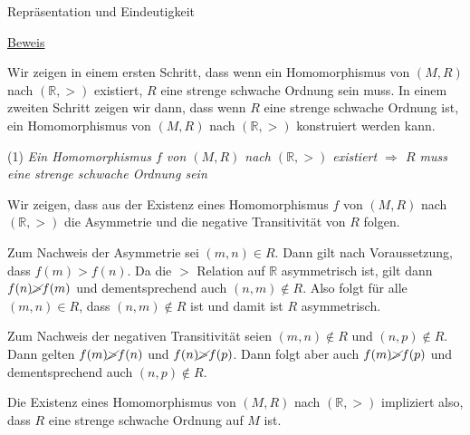 \documentclass[
  8pt,
  ignorenonframetext,
]{beamer}
\begin{document}
\begin{frame}{Repräsentation und Eindeutigkeit}
\protect\hypertarget{repruxe4sentation-und-eindeutigkeit-1}{}
\footnotesize

\underline{Beweis}

Wir zeigen in einem ersten Schritt, dass wenn ein Homomorphismus von
\((M,R)\) nach \((\mathbb{R},>)\) existiert, \(R\) eine strenge schwache
Ordnung sein muss. In einem zweiten Schritt zeigen wir dann, dass wenn
\(R\) eine strenge schwache Ordnung ist, ein Homomorphismus von
\((M,R)\) nach \((\mathbb{R}, >)\) konstruiert werden kann.

\noindent (1) \emph{Ein Homomorphismus \(f\) von \((M,R)\) nach
\((\mathbb{R},>)\) existiert \(\Rightarrow\) \(R\) muss eine strenge
schwache Ordnung sein}

Wir zeigen, dass aus der Existenz eines Homomorphismus \(f\) von
\((M,R)\) nach \((\mathbb{R},>)\) die Asymmetrie und die negative
Transitivität von \(R\) folgen.

Zum Nachweis der Asymmetrie sei \((m,n) \in R\). Dann gilt nach
Voraussetzung, dass \(f(m) > f(n)\). Da die \(>\) Relation auf
\(\mathbb{R}\) asymmetrisch ist, gilt dann \(f(n) \cancel{>} f(m)\) und
dementsprechend auch \((n,m) \notin R\). Also folgt für alle
\((m,n) \in R\), dass \((n,m) \notin R\) ist und damit ist \(R\)
asymmetrisch.

Zum Nachweis der negativen Transitivität seien \((m,n)\notin R\) und
\((n,p)\notin R\). Dann gelten \(f(m)\cancel{>}f(n)\) und
\(f(n)\cancel{>}f(p)\). Dann folgt aber auch \(f(m)\cancel{>}f(p)\) und
dementsprechend auch \((n,p) \notin R\).

Die Existenz eines Homomorphismus von \((M,R)\) nach \((\mathbb{R},>)\)
impliziert also, dass \(R\) eine strenge schwache Ordnung auf \(M\) ist.
\end{frame}
\end{document}
